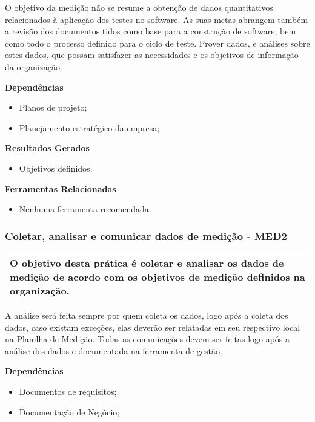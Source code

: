 O objetivo da medição não se resume a obtenção de dados quantitativos relacionados à aplicação dos testes no software. As suas metas abrangem também a revisão dos documentos tidos como base para a construção de software, bem como todo o processo definido para o ciclo de teste. Prover dados, e análises sobre estes dados, que possam satisfazer as necessidades e os objetivos de informação da organização.

\textbf{ Dependências}
\begin{itemize}
    \item Planos de projeto;
    \item Planejamento estratégico da empresa;
\end{itemize}

\textbf{Resultados Gerados }
\begin{itemize}
    \item Objetivos definidos.
\end{itemize}

\textbf{Ferramentas Relacionadas }
\begin{itemize}
    \item Nenhuma ferramenta recomendada.
\end{itemize}

\subsubsection{Coletar, analisar e comunicar dados de medição - MED2}
\label{sec:med2}

\begin{table}[!ht]
\centering
\begin{tabular}{|p{130mm}|}
\hline
O objetivo desta prática é coletar e analisar os dados de medição de acordo com os objetivos de medição definidos na organização. \\ 
\hline
\end{tabular}
\end{table}

A análise será feita sempre por quem coleta os dados, logo após a coleta dos dados, caso existam exceções, elas deverão ser relatadas em seu respectivo local na Planilha de Medição. Todas as comunicações devem ser feitas logo após a análise dos dados e documentada na ferramenta de gestão.

\textbf{Dependências}
\begin{itemize}
    \item Documentos de requisitos;
    \item Documentação de Negócio;
\end{itemize}

